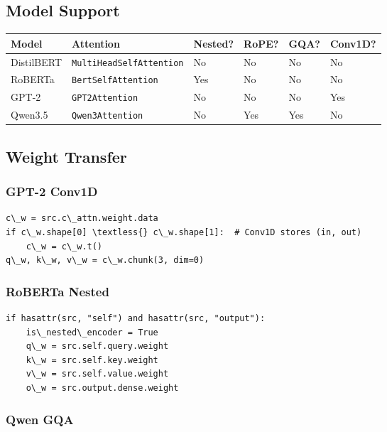 \subsection{Model Support}

\begin{table}[H]
\centering
\small
\begin{tabular}{llllll}
\toprule
\textbf{Model} & \textbf{Attention} & \textbf{Nested?} & \textbf{RoPE?} & \textbf{GQA?} & \textbf{Conv1D?} \\
\midrule
DistilBERT & \texttt{MultiHeadSelfAttention} & No & No & No & No \\
RoBERTa & \texttt{BertSelfAttention} & Yes & No & No & No \\
GPT-2 & \texttt{GPT2Attention} & No & No & No & Yes \\
Qwen3.5 & \texttt{Qwen3Attention} & No & Yes & Yes & No \\
\bottomrule
\end{tabular}
\end{table}

\subsection{Weight Transfer}

\subsubsection{GPT-2 Conv1D}

\begin{lstlisting}
c\_w = src.c\_attn.weight.data
if c\_w.shape[0] \textless{} c\_w.shape[1]:  # Conv1D stores (in, out)
    c\_w = c\_w.t()
q\_w, k\_w, v\_w = c\_w.chunk(3, dim=0)
\end{lstlisting}

\subsubsection{RoBERTa Nested}

\begin{lstlisting}
if hasattr(src, "self") and hasattr(src, "output"):
    is\_nested\_encoder = True
    q\_w = src.self.query.weight
    k\_w = src.self.key.weight
    v\_w = src.self.value.weight
    o\_w = src.output.dense.weight
\end{lstlisting}

\subsubsection{Qwen GQA}

